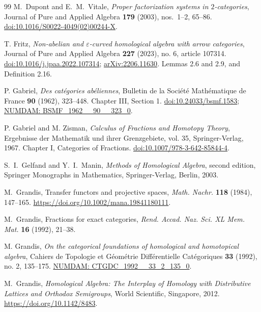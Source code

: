 \documentclass[11pt,reqno,a4paper]{amsart}
\theoremstyle{definition}
\theoremstyle{remark}
\newcommand{\0}{\mathbf{0}}
\renewcommand{\1}{\mathbf{1}}
\begin{document}
\begin{thebibliography}{99}
M.~Dupont and E.~M.~Vitale,
\emph{Proper factorization systems in $2$-categories},
Journal of Pure and Applied Algebra \textbf{179} (2003),
nos.~1--2, 65--86.
\href{https://doi.org/10.1016/S0022-4049(02)00244-X}
{doi:10.1016/S0022-4049(02)00244-X}.

T. Fritz,
\emph{Non-abelian and $\varepsilon$-curved homological algebra with arrow
categories}, Journal of Pure and Applied Algebra \textbf{227} (2023),
no. 6, article 107314.
\href{https://doi.org/10.1016/j.jpaa.2022.107314}{doi:10.1016/j.jpaa.2022.107314};
\href{https://arxiv.org/abs/2206.11630}{arXiv:2206.11630}.
Lemmas 2.6 and 2.9, and Definition 2.16.

P. Gabriel,
\emph{Des cat\'egories ab\'eliennes},
Bulletin de la Soci\'et\'e Math\'ematique de France \textbf{90} (1962),
323--448. Chapter III, Section 1.
\href{https://doi.org/10.24033/bsmf.1583}{doi:10.24033/bsmf.1583};
\href{https://www.numdam.org/item/BSMF_1962__90__323_0/}{NUMDAM: BSMF\_1962\_\_90\_\_323\_0}.

P. Gabriel and M. Zisman,
\emph{Calculus of Fractions and Homotopy Theory},
Ergebnisse der Mathematik und ihrer Grenzgebiete, vol. 35,
Springer-Verlag, 1967. Chapter I, Categories of Fractions.
\href{https://doi.org/10.1007/978-3-642-85844-4}{doi:10.1007/978-3-642-85844-4}.

S.~I.~Gelfand and Y.~I.~Manin,
\emph{Methods of Homological Algebra}, second edition,
Springer Monographs in Mathematics, Springer-Verlag, Berlin, 2003.

M.~Grandis,
Transfer functors and projective spaces,
\emph{Math. Nachr.} \textbf{118} (1984), 147--165.
\newline\url{https://doi.org/10.1002/mana.19841180111}.

M.~Grandis,
Fractions for exact categories,
\emph{Rend. Accad. Naz. Sci. XL Mem. Mat.} \textbf{16} (1992), 21--38.

M. Grandis,
\emph{On the categorical foundations of homological and homotopical
algebra}, Cahiers de Topologie et G\'eom\'etrie Diff\'erentielle
Cat\'egoriques \textbf{33} (1992), no. 2, 135--175.
\href{https://www.numdam.org/item/CTGDC_1992__33_2_135_0/}{NUMDAM: CTGDC\_1992\_\_33\_2\_135\_0}.

M.~Grandis,
\emph{Homological Algebra: The Interplay of Homology with Distributive
Lattices and Orthodox Semigroups},
World Scientific, Singapore, 2012.
\newline\url{https://doi.org/10.1142/8483}.


\end{thebibliography}
\end{document}
